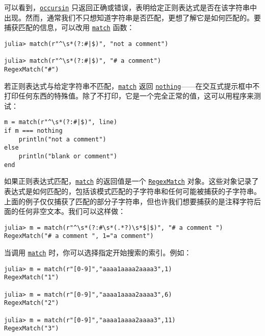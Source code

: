 可以看到，\hyperlink{7988132114328914630}{\texttt{occursin}} 只返回正确或错误，表明给定正则表达式是否在该字符串中出现。然而，通常我们不只想知道字符串是否匹配，更想了解它是如何匹配的。要捕获匹配的信息，可以改用 \hyperlink{2695862412477105800}{\texttt{match}} 函数：




\begin{verbatim}
julia> match(r"^\s*(?:#|$)", "not a comment")

julia> match(r"^\s*(?:#|$)", "# a comment")
RegexMatch("#")
\end{verbatim}



若正则表达式与给定字符串不匹配，\hyperlink{2695862412477105800}{\texttt{match}} 返回 \hyperlink{9331422207248206047}{\texttt{nothing}}——在交互式提示框中不打印任何东西的特殊值。除了不打印，它是一个完全正常的值，这可以用程序来测试：




\begin{verbatim}
m = match(r"^\s*(?:#|$)", line)
if m === nothing
    println("not a comment")
else
    println("blank or comment")
end
\end{verbatim}



如果正则表达式匹配，\hyperlink{2695862412477105800}{\texttt{match}} 的返回值是一个 \href{@ref}{\texttt{RegexMatch}} 对象。这些对象记录了表达式是如何匹配的，包括该模式匹配的子字符串和任何可能被捕获的子字符串。上面的例子仅仅捕获了匹配的部分子字符串，但也许我们想要捕获的是注释字符后面的任何非空文本。我们可以这样做：




\begin{verbatim}
julia> m = match(r"^\s*(?:#\s*(.*?)\s*$|$)", "# a comment ")
RegexMatch("# a comment ", 1="a comment")
\end{verbatim}



当调用 \hyperlink{2695862412477105800}{\texttt{match}} 时，你可以选择指定开始搜索的索引。例如：




\begin{verbatim}
julia> m = match(r"[0-9]","aaaa1aaaa2aaaa3",1)
RegexMatch("1")

julia> m = match(r"[0-9]","aaaa1aaaa2aaaa3",6)
RegexMatch("2")

julia> m = match(r"[0-9]","aaaa1aaaa2aaaa3",11)
RegexMatch("3")
\end{verbatim}



